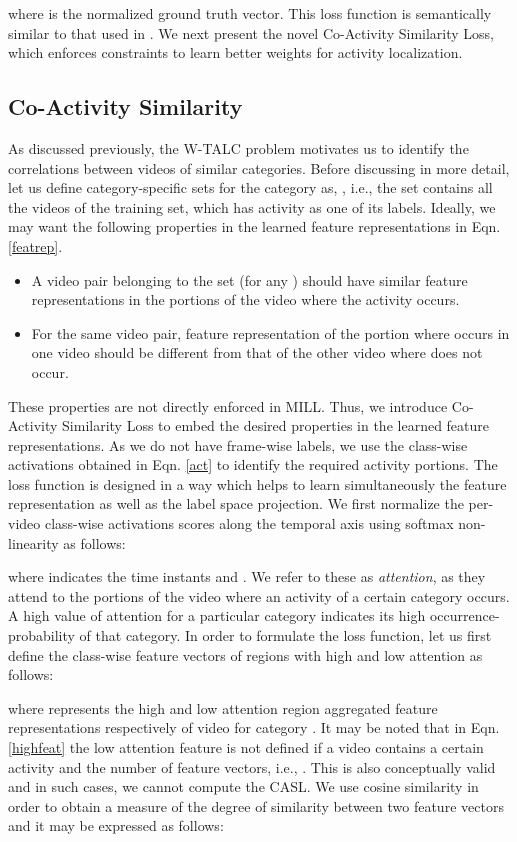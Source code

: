 \documentclass[runningheads]{llncs}
\begin{document}
where  is the normalized ground truth vector. This loss function is semantically similar to that used in \cite{wang2017untrimmednets}. We next present the novel Co-Activity Similarity Loss, which enforces constraints to learn better weights for activity localization.

\subsection{Co-Activity Similarity}
As discussed previously, the W-TALC problem motivates us to identify the correlations between videos of similar categories. Before discussing in more detail, let us define category-specific sets for the  category as, , 
i.e., the set  contains all the videos of the training set, which has activity  as one of its labels. Ideally, we may want the following properties in the learned feature representations  in Eqn. \ref{featrep}.

\begin{itemize}
	\item A video pair belonging to the set  (for any ) should have similar feature representations in the portions of the video where the activity  occurs. 
	\item For the same video pair, feature representation of the portion where  occurs in one video should be different from that of the other video where  does not occur.
\end{itemize} 
These properties are not directly enforced in MILL. Thus, we introduce Co-Activity Similarity Loss to embed the desired properties in the learned feature representations. As we do not have frame-wise labels, we use the class-wise activations obtained in Eqn. \ref{act} to identify the required activity portions. The loss function is designed in a way which helps to learn simultaneously the feature representation as well as the label space projection. We first normalize the per-video class-wise activations scores along the temporal axis using softmax non-linearity as follows:

where  indicates the time instants and . We refer to these as \textit{attention}, as they attend to the portions of the video where an activity of a certain category occurs. A high value of attention for a particular category indicates its high occurrence-probability of that category. In order to formulate the loss function, let us first define the class-wise feature vectors of regions with high and low attention as follows: 

where  represents the high and low attention region aggregated feature representations respectively of video  for category . It may be noted that in Eqn. \ref{highfeat} the low attention feature is not defined if a video contains a certain activity and the number of feature vectors, i.e., . This is also conceptually valid and in such cases, we cannot compute the CASL. We use cosine similarity in order to obtain a measure of the degree of similarity between two feature vectors and it may be expressed as follows:
\end{document}
